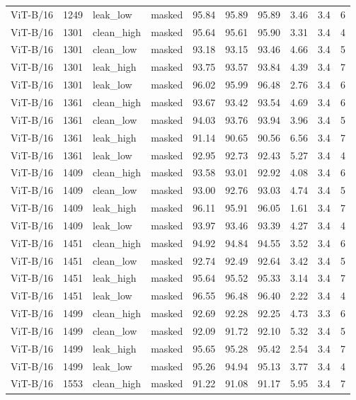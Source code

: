 {\begin{longtable}{lrllrrrrrr}
ViT-B/16 & 1249 & leak\_low & masked & 95.84 & 95.89 & 95.89 & 3.46 & 3.4 & 6 \\
ViT-B/16 & 1301 & clean\_high & masked & 95.64 & 95.61 & 95.90 & 3.31 & 3.4 & 4 \\
ViT-B/16 & 1301 & clean\_low & masked & 93.18 & 93.15 & 93.46 & 4.66 & 3.4 & 5 \\
ViT-B/16 & 1301 & leak\_high & masked & 93.75 & 93.57 & 93.84 & 4.39 & 3.4 & 7 \\
ViT-B/16 & 1301 & leak\_low & masked & 96.02 & 95.99 & 96.48 & 2.76 & 3.4 & 6 \\
ViT-B/16 & 1361 & clean\_high & masked & 93.67 & 93.42 & 93.54 & 4.69 & 3.4 & 6 \\
ViT-B/16 & 1361 & clean\_low & masked & 94.03 & 93.76 & 93.94 & 3.96 & 3.4 & 5 \\
ViT-B/16 & 1361 & leak\_high & masked & 91.14 & 90.65 & 90.56 & 6.56 & 3.4 & 7 \\
ViT-B/16 & 1361 & leak\_low & masked & 92.95 & 92.73 & 92.43 & 5.27 & 3.4 & 4 \\
ViT-B/16 & 1409 & clean\_high & masked & 93.58 & 93.01 & 92.92 & 4.08 & 3.4 & 6 \\
ViT-B/16 & 1409 & clean\_low & masked & 93.00 & 92.76 & 93.03 & 4.74 & 3.4 & 5 \\
ViT-B/16 & 1409 & leak\_high & masked & 96.11 & 95.91 & 96.05 & 1.61 & 3.4 & 7 \\
ViT-B/16 & 1409 & leak\_low & masked & 93.97 & 93.46 & 93.39 & 4.27 & 3.4 & 4 \\
ViT-B/16 & 1451 & clean\_high & masked & 94.92 & 94.84 & 94.55 & 3.52 & 3.4 & 6 \\
ViT-B/16 & 1451 & clean\_low & masked & 92.74 & 92.49 & 92.64 & 3.42 & 3.4 & 5 \\
ViT-B/16 & 1451 & leak\_high & masked & 95.64 & 95.52 & 95.33 & 3.14 & 3.4 & 7 \\
ViT-B/16 & 1451 & leak\_low & masked & 96.55 & 96.48 & 96.40 & 2.22 & 3.4 & 4 \\
ViT-B/16 & 1499 & clean\_high & masked & 92.69 & 92.28 & 92.25 & 4.73 & 3.3 & 6 \\
ViT-B/16 & 1499 & clean\_low & masked & 92.09 & 91.72 & 92.10 & 5.32 & 3.4 & 5 \\
ViT-B/16 & 1499 & leak\_high & masked & 95.65 & 95.28 & 95.42 & 2.54 & 3.4 & 7 \\
ViT-B/16 & 1499 & leak\_low & masked & 95.26 & 94.94 & 95.13 & 3.77 & 3.4 & 4 \\
ViT-B/16 & 1553 & clean\_high & masked & 91.22 & 91.08 & 91.17 & 5.95 & 3.4 & 7 \\

\end{longtable}}
